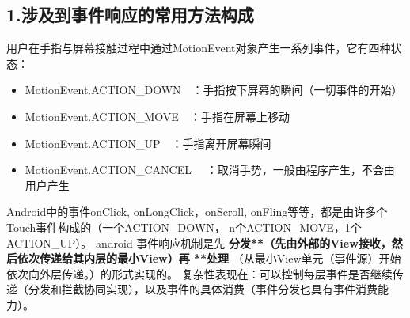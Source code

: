\documentclass[9pt, b5paper]{article}
\begin{document}
\subsection{1.涉及到事件响应的常用方法构成}
\label{sec-12-1}
用户在手指与屏幕接触过程中通过MotionEvent对象产生一系列事件，它有四种状态：
\begin{itemize}
\item MotionEvent.ACTION\_DOWN　：手指按下屏幕的瞬间（一切事件的开始）

\item MotionEvent.ACTION\_MOVE　：手指在屏幕上移动

\item MotionEvent.ACTION\_UP　：手指离开屏幕瞬间

\item MotionEvent.ACTION\_CANCEL 　：取消手势，一般由程序产生，不会由用户产生
\end{itemize}
Android中的事件onClick, onLongClick，onScroll, onFling等等，都是由许多个Touch事件构成的（一个ACTION\_DOWN， n个ACTION\_MOVE，1个ACTION\_UP）。
android 事件响应机制是先 \textbf{\textbf{分发**（先由外部的View接收，然后依次传递给其内层的最小View）再 **处理}} （从最小View单元（事件源）开始依次向外层传递。）的形式实现的。
复杂性表现在：可以控制每层事件是否继续传递（分发和拦截协同实现），以及事件的具体消费（事件分发也具有事件消费能力）。
\end{document}
